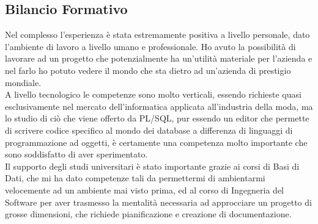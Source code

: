 \subsection{Bilancio Formativo}
Nel complesso l'esperienza è stata estremamente positiva a livello personale, dato l'ambiente di lavoro a livello umano e professionale. Ho avuto la possibilità di lavorare ad un progetto che potenzialmente ha un'utilità materiale per l'azienda e nel farlo ho potuto vedere il mondo che sta dietro ad un'azienda di prestigio mondiale.\\
A livello tecnologico le competenze sono molto verticali, essendo richieste quasi esclusivamente nel mercato dell'informatica applicata all'industria della moda, ma lo studio di ciò che viene offerto da PL/SQL, pur essendo un editor che permette di scrivere codice specifico al mondo dei database a differenza di linguaggi di programmazione ad oggetti, è certamente una competenza molto importante che sono soddisfatto di aver sperimentato.\\
Il supporto degli studi universitari è stato importante grazie ai corsi di Basi di Dati, che mi ha dato competenze tali da permettermi di ambientarmi velocemente ad un ambiente mai visto prima, ed al corso di Ingegneria del Software per aver trasmesso la mentalità necessaria ad approcciare un progetto di grosse dimensioni, che richiede pianificazione e creazione di documentazione.